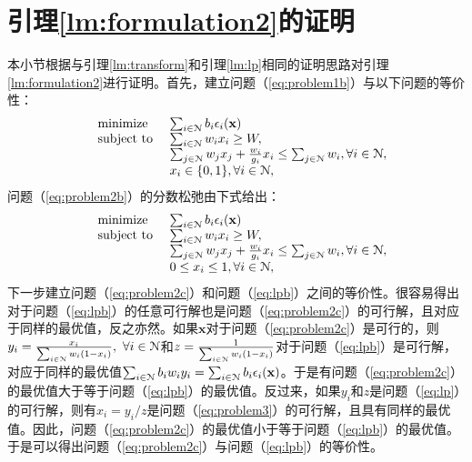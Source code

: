 \section{引理\ref{lm:formulation2}的证明}\label{app2}
	本小节根据与引理\ref{lm:transform}和引理\ref{lm:lp}相同的证明思路对引理\ref{lm:formulation2}进行证明。首先，建立问题（\ref{eq:problem1b}）与以下问题的等价性：
		\begin{equation}%
		\hspace{-0.0cm}
		\begin{array}
		[c]{lll}%
		&{\text{minimize}}&~\sum_{i\in\N}b_i\e_i(\mathbf{x})
		\\
		&\text{subject to}&~ \sum_{i\in\N}w_ix_i\ge W,\\
		&&~ \sum_{j\in\N}w_jx_j+\frac{w_i}{g_i}x_i\leq\sum_{j\in\N}w_i, \forall i\in\N,\\
		&&~ x_i\in\{0,1\}, \forall i\in\N,
		\end{array}
		\label{eq:problem2b}
		\end{equation}
		问题（\ref{eq:problem2b}）的分数松弛由下式给出：
		\begin{equation}%
		\hspace{-0.0cm}
		\begin{array}
		[c]{lll}%
		&{\text{minimize}}&~\sum_{i\in\N}b_i\e_i(\mathbf{x})
		\\
		&\text{subject to}&~ \sum_{i\in\N}w_ix_i\ge W,\\
		&&~ \sum_{j\in\N}w_jx_j+\frac{w_i}{g_i}x_i\leq\sum_{j\in\N}w_i, \forall i\in\N,\\
		&&~ 0\leq x_i\leq 1, \forall i\in\N,
		\end{array}
		\label{eq:problem2c}
		\end{equation}
	下一步建立问题（\ref{eq:problem2c}）和问题（\ref{eq:lpb}）之间的等价性。很容易得出对于问题（\ref{eq:lpb}）的任意可行解也是问题（\ref{eq:problem2c}）的可行解，且对应于同样的最优值，反之亦然。如果$\mathbf{x}$对于问题（\ref{eq:problem2c}）是可行的，则$y_i=\frac{x_i}{\sum_{i\in\mathcal{N}}w_i(1-x_i)},~\forall i\in\mathcal{N}$和$z=\frac{1}{\sum_{i\in\mathcal{N}}w_i(1-x_i)}$对于问题（\ref{eq:lpb}）是可行解，对应于同样的最优值$\sum_{i\in\mathcal{N}}b_iw_iy_i=\sum_{i\in\mathcal{N}}b_i\epsilon_i(\mathbf{x})$。于是有问题（\ref{eq:problem2c}）的最优值大于等于问题（\ref{eq:lpb}）的最优值。反过来，如果$y_i$和$z$是问题（\ref{eq:lp}）的可行解，则有$x_i=y_i/z$是问题（\ref{eq:problem3}）的可行解，且具有同样的最优值。因此，问题（\ref{eq:problem2c}）的最优值小于等于问题（\ref{eq:lpb}）的最优值。于是可以得出问题（\ref{eq:problem2c}）与问题（\ref{eq:lpb}）的等价性。

